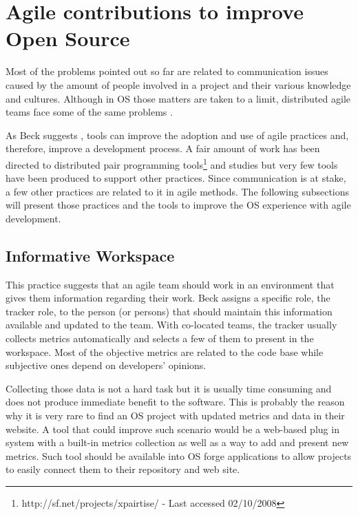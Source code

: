 \section{Agile contributions to improve Open Source}
\label{sec:agile-improve-os}

Most of the problems pointed out so far are related to communication
issues caused by the amount of people involved in a project and their
various knowledge and cultures. Although in OS those matters are taken
to a limit, distributed agile teams face some of the same problems
\cite{Sutherland2007,Maurer2002}.

As Beck suggests \cite{Beck2008}, tools can improve the adoption and
use of agile practices and, therefore, improve a development
process. A fair amount of work has been directed to distributed pair
programming tools\footnote{http://sf.net/projects/xpairtise/ - Last
  accessed 02/10/2008} and studies \cite{Nagappan2003} but very few
tools have been produced to support other practices. Since
communication is at stake, a few other practices are related to it in
agile methods. The following subsections will present those practices
and the tools to improve the OS experience with agile development.

\subsection{Informative Workspace}
\label{subsec:inform-worksp}

This practice suggests that an agile team should work in an
environment that gives them information regarding their work. Beck
assigns a specific role, the tracker role, to the person (or persons)
that should maintain this information available and updated to the
team. With co-located teams, the tracker usually collects metrics
\cite{Sato2007} automatically and selects a few of them to present in
the workspace. Most of the objective metrics are related to the code
base while subjective ones depend on developers' opinions.

Collecting those data is not a hard task but it is usually time
consuming and does not produce immediate benefit to the software.
This is probably the reason why it is very rare to find an OS project
with updated metrics and data in their website. A tool that could
improve such scenario would be a web-based plug in system with a
built-in metrics collection as well as a way to add and present new
metrics. Such tool should be available into OS forge applications to
allow projects to easily connect them to their repository and web
site.

